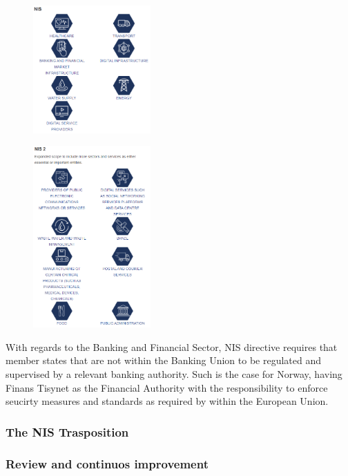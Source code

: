 \begin{figure}[H]
    \includegraphics[width=0.4\textwidth]{tex/NIS1_Sectors_and_Scope.png}
\end{figure}
\begin{figure}[H]
    \includegraphics[width=0.4\textwidth]{tex/NIS2_Sectors_and_Scope.png}
\end{figure}


With regards to the Banking and Financial Sector, NIS directive requires that member states that are not within the Banking Union to be regulated and supervised by a relevant banking authority. Such is the case for Norway, having Finans Tisynet as the Financial Authority with the responsibility to enforce seucirty measures and standards as required by within the European Union.

\subsubsection{The NIS Trasposition}


\subsubsection{Review and continuos improvement}

